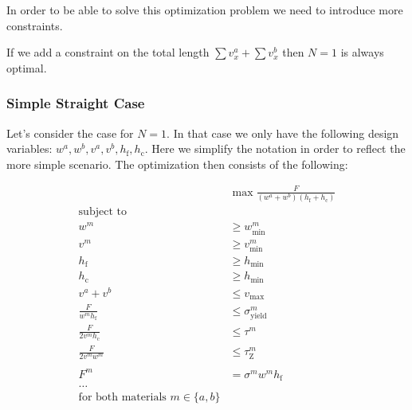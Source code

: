 In order to be able to solve this optimization problem we need to introduce more constraints.

If we add a constraint on the total length $\sum v^a_x + \sum v^b_x$ then $N=1$ is always optimal.


\subsubsection{Simple Straight Case}
Let's consider the case for $N=1$.
In that case we only have the following design variables: $w^a, w^b, v^a, v^b, h_\text{f}, h_\text{c}$.
Here we simplify the notation in order to reflect the more simple scenario.
The optimization then consists of the following:

\begin{align}
	& \max \frac{F}{\left( w^a + w^b \right) \left( h_\text{f} + h_\text{c} \right) } \\
	\text{subject to} & \nonumber \\
	w^m &\ge w_\text{min}^m \\
	v^m &\ge v_\text{min}^m \\
	h_\text{f} &\ge h_\text{min} \\
	h_\text{c} &\ge h_\text{min} \\
	v^a + v^b &\le v_\text{max} \\
	\frac{ F }{ w^m h_\text{f} } &\le \sigma^m_\text{yield} \\
	\frac{ F }{ 2 v^m h_\text{c}} &\le \tau^m \\
	\frac{ F }{ 2 v^m w^m } &\le \tau^m_\text{Z} \\
	\nonumber \\
	F^m &= \sigma^m w^m h_\text{f} \\
	\dots \\
	\text{for both materials } m \in \{a, b\}
\end{align}


